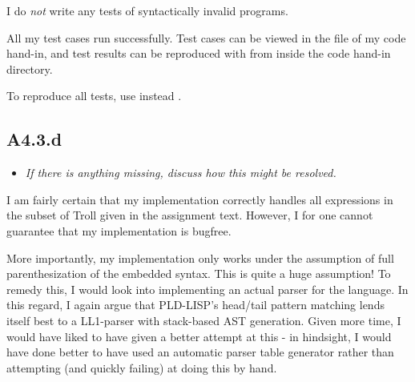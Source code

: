 \smallskip

I do \emph{not} write any tests of syntactically invalid programs.

\medskip

All my test cases run successfully. Test cases can be viewed in the
 file of my code hand-in, and test results can be reproduced with
 from inside the code hand-in directory.

\medskip

To reproduce all tests, use instead .

\sectend

\subsection{A4.3.d}

\begin{itemize}
    \item \emph{If there is anything missing, discuss how this might be
      resolved.}
\end{itemize}

I am fairly certain that my implementation correctly handles all expressions in
the subset of Troll given in the assignment text. However, I for one cannot
guarantee that my implementation is bugfree.

\smallskip

More importantly, my implementation only works under the assumption of full
parenthesization of the embedded syntax. This is quite a huge assumption! To
remedy this, I would look into implementing an actual parser for the language.
In this regard, I again argue that PLD-LISP's head/tail pattern matching lends
itself best to a LL1-parser with stack-based AST generation. Given more time, I
would have liked to have given a better attempt at this - in hindsight, I would
have done better to have used an automatic parser table generator rather than
attempting (and quickly failing) at doing this by hand.

\Sectend
